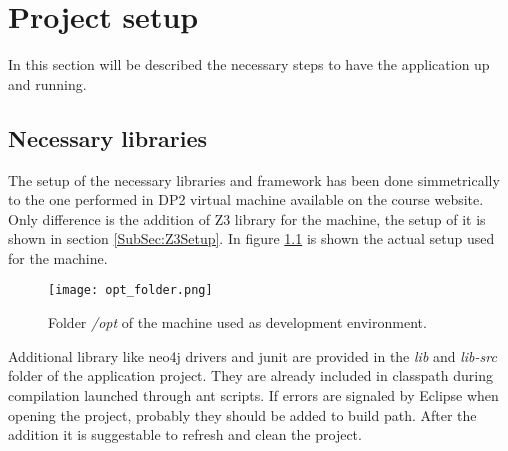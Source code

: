 \chapter{Project setup}\label{Chap:Setup}
In this section will be described the necessary steps to have the application up and running.
\section{Necessary libraries}
The setup of the necessary libraries and framework has been done simmetrically to the one performed in DP2 virtual machine available on the course website. Only difference is the addition of Z3 library for the machine, the setup of it is shown in section \ref{SubSec:Z3Setup}. In figure \ref{Fig:OptFolder} is shown the actual setup used for the machine.
\begin{figure}[!htb]
   \centering
   \texttt{[image: opt\_folder.png]}
   \caption{Folder \textit{/opt} of the machine used as development environment.}\label{Fig:OptFolder}
\end{figure}
Additional library like neo4j drivers and junit are provided in the \textit{lib} and \textit{lib-src} folder of the application project. They are already included in classpath during compilation launched through ant scripts. If errors are signaled by Eclipse when opening the project, probably they should be added to build path. After the addition it is suggestable to refresh and clean the project.

